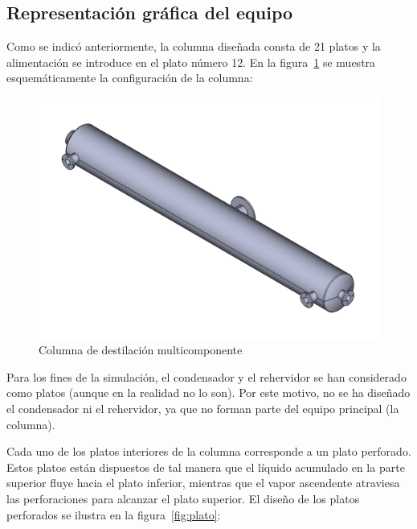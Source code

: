 \subsection{Representación gráfica del equipo}

Como se indicó anteriormente, la columna diseñada consta de 21 platos y la alimentación se introduce en el plato número 12. En la figura~\ref{fig:columna} se muestra esquemáticamente la configuración de la columna:

\begin{figure}[ht]
    \centering
    \includegraphics[width=1\linewidth]{../../desings/columna.pdf}
    \caption{Columna de destilación multicomponente}
    \label{fig:columna}
\end{figure}

Para los fines de la simulación, el condensador y el rehervidor se han considerado como platos (aunque en la realidad no lo son). Por este motivo, no se ha diseñado el condensador ni el rehervidor, ya que no forman parte del equipo principal (la columna).

\newpage
\vspace*{\fill}
Cada uno de los platos interiores de la columna corresponde a un plato perforado. Estos platos están dispuestos de tal manera que el líquido acumulado en la parte superior fluye hacia el plato inferior, mientras que el vapor ascendente atraviesa las perforaciones para alcanzar el plato superior. El diseño de los platos perforados se ilustra en la figura~\ref{fig:plato}:

